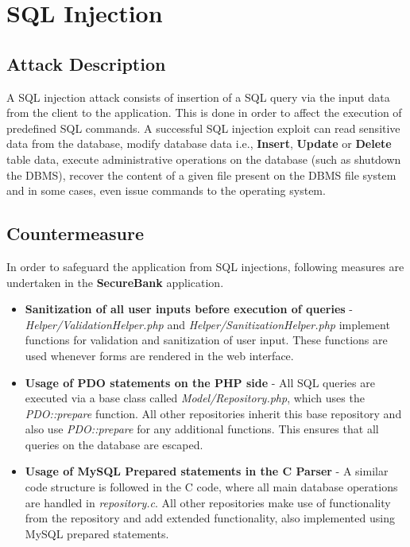 \section{SQL Injection}

\subsection{Attack Description}
A SQL injection attack consists of insertion of a SQL query via the input data from the client to the application. This is done in order to affect the execution of predefined SQL commands.
A successful SQL injection exploit can read sensitive data from the database, modify database data i.e., \textbf{Insert}, \textbf{Update} or \textbf{Delete} table data, execute administrative operations on the database (such as shutdown the DBMS), recover the content of a given file present on the DBMS file system and in some cases, even issue commands to the operating system.

\subsection{Countermeasure}
In order to safeguard the application from SQL injections, following measures are undertaken in the \textbf{SecureBank} application.
\begin{itemize}
\item \textbf{Sanitization of all user inputs before execution of queries} -  \textit{Helper/ValidationHelper.php} and \textit{Helper/SanitizationHelper.php} implement functions for validation and sanitization of user input. These functions are used whenever forms are rendered in the web interface.
\item \textbf{Usage of PDO statements on the PHP side} - All SQL queries are executed via a base class called \textit{Model/Repository.php}, which uses the \textit{PDO::prepare} function. All other repositories inherit this base repository and also use \textit{PDO::prepare} for any additional functions. This ensures that all queries on the database are escaped.
\item \textbf{Usage of MySQL Prepared statements in the C Parser} - A similar code structure is followed in the C code, where all main database operations are handled in \textit{repository.c}. All other repositories make use of functionality from the repository and add extended functionality, also implemented using MySQL prepared statements. 
\end{itemize}